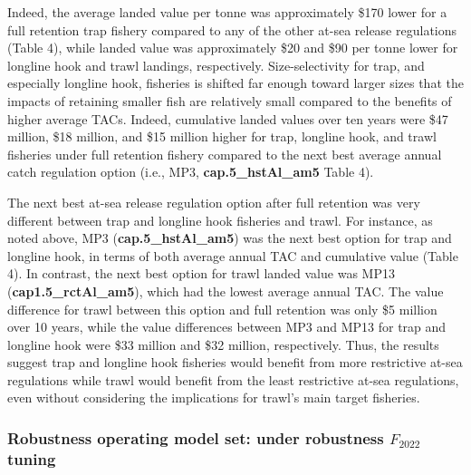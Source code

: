 \documentclass[11pt]{book}
\begin{document}
Indeed, the average landed value per tonne was approximately \$170 lower for a full retention trap fishery compared to any of the other at-sea release regulations (Table 4), while landed value was approximately \$20 and \$90 per tonne lower for longline hook and trawl landings, respectively. Size-selectivity for trap, and especially longline hook, fisheries is shifted far enough toward larger sizes that the impacts of retaining smaller fish are relatively small compared to the benefits of higher average TACs. Indeed, cumulative landed values over ten years were \$47 million, \$18 million, and \$15 million higher for trap, longline hook, and trawl fisheries under full retention fishery compared to the next best average annual catch regulation option (i.e., MP3, \textbf{cap.5\_hstAl\_am5} Table 4).

The next best at-sea release regulation option after full retention was very different between trap and longline hook fisheries and trawl. For instance, as noted above, MP3 (\textbf{cap.5\_hstAl\_am5}) was the next best option for trap and longline hook, in terms of both average annual TAC and cumulative value (Table 4). In contrast, the next best option for trawl landed value was MP13 (\textbf{cap1.5\_rctAl\_am5}), which had the lowest average annual TAC. The value difference for trawl between this option and full retention was only \$5 million over 10 years, while the value differences between MP3 and MP13 for trap and longline hook were \$33 million and \$32 million, respectively. Thus, the results suggest trap and longline hook fisheries would benefit from more restrictive at-sea regulations while trawl would benefit from the least restrictive at-sea regulations, even without considering the implications for trawl's main target fisheries.

\hypertarget{robustness-operating-model-set-under-robustness-f_2022-tuning}{%
\subsubsection{\texorpdfstring{Robustness operating model set: under robustness \(F_{2022}\) tuning}{Robustness operating model set: under robustness F\_\{2022\} tuning}}\label{robustness-operating-model-set-under-robustness-f_2022-tuning}}
\end{document}
